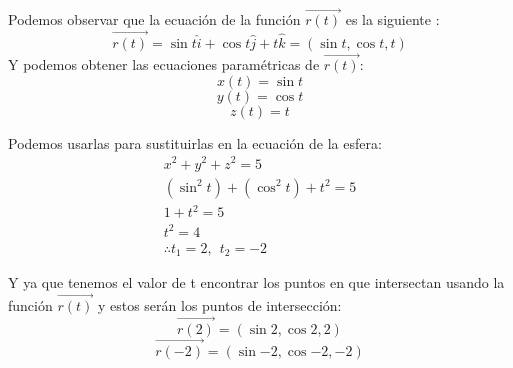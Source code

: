 \documentclass[12pt]{article}
\begin{document}
Podemos observar que la ecuación de la función $\vec{r(t)}$ es la siguiente :
\[
\vec{r(t)}=\sin{t}\hat{i}+\cos{t}\hat{j}+t\hat{k} = (\sin{t},\cos{t}, t )\]
Y podemos obtener las ecuaciones paramétricas de $\vec{r(t)}$:
\[ x(t) =  \sin{t} \]
\[ y(t) =  \cos{t} \]
\[ z(t) =  t \]

Podemos usarlas para sustituirlas en la ecuación de la esfera:
 \begin{align*}
   x^2+y^2+z^2=5 \\
   (\sin^2{t}) + (\cos^2{t}) + t ^2 = 5 \\
   1+ t ^2 = 5 \\
   t ^2 = 4 \\
   \therefore t_1 = 2, ~ ~  t_2 = -2
 \end{align*}

 Y ya que tenemos el valor de t encontrar los puntos en que intersectan usando la función $\vec{r(t)}$ y estos serán los puntos de intersección:
\[
\vec{r(2)} = (\sin{2},\cos{2}, 2 )
\]
\[
\vec{r(-2)}= (\sin{-2},\cos{-2}, -2 )
\]
\end{document}
